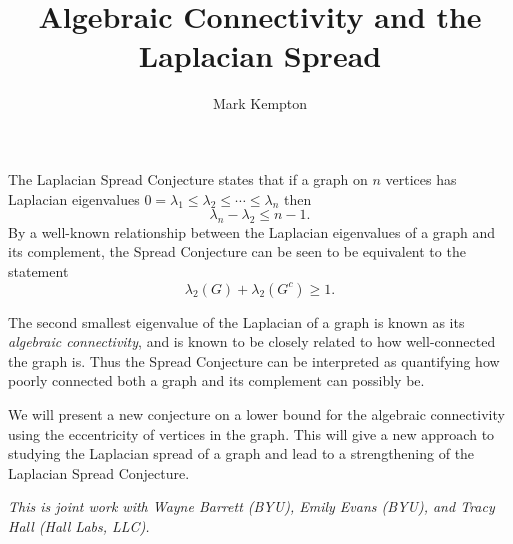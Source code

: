 \documentclass[a4paper]{amsart}
\date{}
\begin{document}
\title{Algebraic Connectivity and the Laplacian Spread}
\author{Mark Kempton} %
\address{Brigham Young University} %

\maketitle


The Laplacian Spread Conjecture states that if a graph on $n$ vertices has Laplacian eigenvalues $0=\lambda_1\leq\lambda_2\leq\cdots\leq\lambda_n$ then \[\lambda_n-\lambda_2\leq n-1.\]  By a well-known relationship between the Laplacian eigenvalues of a graph and its complement, the Spread Conjecture can be seen to be equivalent to the statement \[\lambda_2(G) + \lambda_2(G^c)\geq1.\]  

The second smallest eigenvalue of the Laplacian of a graph is known as its \emph{algebraic connectivity}, and is known to be closely related to how well-connected the graph is.  Thus the Spread Conjecture can be interpreted as quantifying how poorly connected both a graph and its complement can possibly be.  

We will present a new conjecture on a lower bound for the algebraic connectivity using the eccentricity of vertices in the graph.  This will give a new approach to studying the Laplacian spread of a graph and lead to a strengthening of the Laplacian Spread Conjecture.


\emph{This is joint work with Wayne Barrett (BYU), Emily Evans (BYU), and Tracy Hall (Hall Labs, LLC). 
}

%
\end{document}
